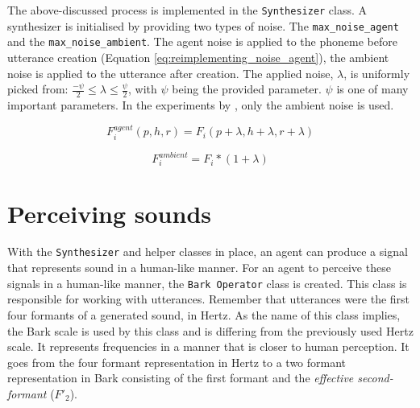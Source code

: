 The above-discussed process is implemented in the \texttt{Synthesizer} class.
A synthesizer is initialised by providing two types of noise.
The \texttt{max\_noise\_agent} and the \texttt{max\_noise\_ambient}.
The agent noise is applied to the phoneme before utterance creation (Equation \ref{eq:reimplementing_noise_agent}), the ambient noise is applied to the utterance after creation.
The applied noise, $\lambda$, is uniformly picked from: $\frac{-\psi}{2} \leq \lambda \leq \frac{\psi}{2}$, with $\psi$ being the provided parameter.
$\psi$ is one of many important parameters.
In the experiments by \citet{deBoer2000}, only the ambient noise is used.

\begin{equation}
F^{agent}_{i}(p, h, r) = F_{i}(p + \lambda, h + \lambda, r + \lambda)
\label{eq:reimplementing_noise_agent}
\end{equation}

\begin{equation}
F^{ambient}_{i} = F_{i} * (1 + \lambda)
\label{eq:reimplementing_noise_ambient}
\end{equation}

\section{Perceiving sounds}
\label{sec:reimplementing_perceive}

With the \texttt{Synthesizer} and helper classes in place, an agent can produce a signal that represents sound in a human-like manner.
For an agent to perceive these signals in a human-like manner, the \texttt{Bark Operator} class is created.
This class is responsible for working with utterances.
Remember that utterances were the first four formants of a generated sound, in Hertz.
As the name of this class implies, the Bark scale is used by this class and is differing from the previously used Hertz scale. 
It represents frequencies in a manner that is closer to human perception.
It goes from the four formant representation in Hertz to a two formant representation in Bark consisting of the first formant and the \textit{effective second-formant} ($F'_2$).

